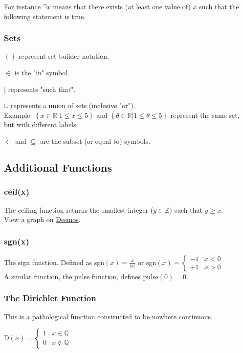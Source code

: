 \documentclass{article}
\begin{document}
For instance $\exists x$ means that there exists (at least one value of) $x$ such that the following statement is true.

\subsubsection{Sets}
$\left\{\right\}$ represent set builder notation.

$\in$ is the "in" symbol.

$|$ represents "such that".

$\cup$ represents a union of sets (inclusive "or").\\
Example: $\left\{x \in \mathbb{R} | 1 \le x \le 5 \right\}$ and $\left\{\theta \in \mathbb{R} | 1 \le \theta \le 5 \right\}$ represent the same set, but with different labels.

$\subset$ and $\subseteq$ are the subset (or equal to) symbols.

\subsection{Additional Functions}
\subsubsection{ceil(x)}
The ceiling function returns the smallest integer ($y\in\mathbb{Z}$) such that $y \ge x$.\\
View a graph on \href{https://www.desmos.com/calculator/cpay9r9g5w}{Desmos}.

\subsubsection{sgn(x)}
The sign function. Defined as
sgn$(x) = \frac{x}{|x|}$ or sgn$(x) = \begin{cases}
    -1 &x<0\\
    +1 &x>0
\end{cases}$\\
A similar function, the pulse function, defines pulse$(0)=0$.

\subsubsection{The Dirichlet Function}
This is a pathological function constructed to be nowhere continuous.

D$(x) = \begin{cases}
    1 & x\in\mathbb{Q}\\
    0 & x\notin\mathbb{Q}
\end{cases}$
\end{document}

